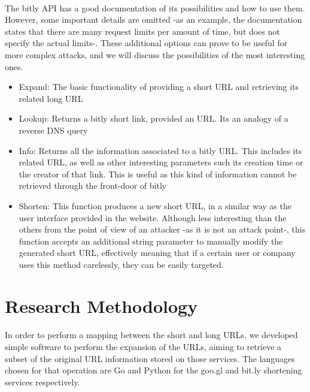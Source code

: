 \documentclass[12pt]{article}
\begin{document}
\paragraph{}
The bitly API has a good documentation of its possibilities and how to use them. However, some important details are omitted -as an example, the documentation states that there are many request limits per amount of time, but does not specify the actual limits-. These additional options can prove to be useful for more complex attacks, and we will discuss the possibilities of the most interesting ones.

\begin{itemize}

\item {Expand: The basic functionality of providing a short URL and retrieving its related long URL}
\item{Lookup: Returns a bitly short link, provided an URL. Its an analogy of a reverse DNS query}
\item {Info: Returns all the information associated to a bitly URL. This includes its related URL, as  well as other interesting parameters such its creation time or the creator of that link. This is useful as this kind of information cannot be retrieved through the front-door of bitly}
\item {Shorten: This function produces a new short URL, in a similar way as the user interface provided in the website. Although less interesting than the others from the point of view of an attacker -as it is not an attack point-, this function accepts an additional string parameter to manually modify the generated short URL, effectively meaning that if a certain user or company uses this method carelessly, they can be easily targeted.}
\end{itemize}


\newpage
\section{Research Methodology}

\paragraph{}
In order to perform a mapping between the short and long URLs, we developed simple software to perform the expansion of the URLs, aiming to retrieve a subset of the original URL information stored on those services. The languages chosen for that operation are Go and Python for the goo.gl and bit.ly shortening services respectively. 
\end{document}
